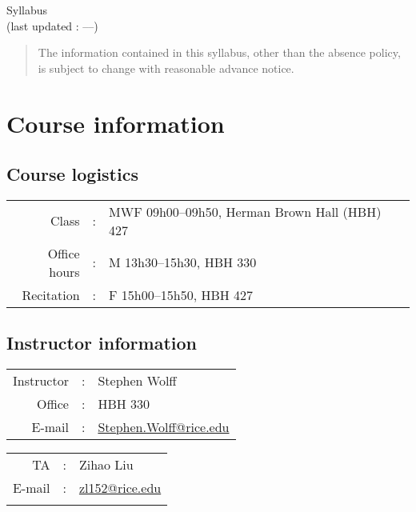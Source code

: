 \begin{center}
{\Large Syllabus}\\
{\scriptsize (last updated : \Year--\Month--\Day)}
\end{center}



\begin{quote}
The information contained in this syllabus, other than the absence policy, is subject to change with reasonable advance notice.
\end{quote}





%
%
%
%

\section{Course information}



\subsection{Course logistics}

\begin{tabular}{r c l}
Class			&	:	&	MWF 09h00--09h50, Herman Brown Hall (HBH) 427	\\
Office hours	&	:	&	M 13h30--15h30, HBH 330	\\
Recitation		&	:	&	F 15h00--15h50, HBH 427
\end{tabular}



\subsection{Instructor information}

\begin{tabular}{r c l}
Instructor	&	:	&	Stephen Wolff	\\
Office	&	:	&	HBH 330	\\
E-mail	&	:	&	\href{mailto:Stephen.Wolff@rice.edu?subject=[Math\%20357]}{Stephen.Wolff@rice.edu}
\end{tabular}
\hspace{0.25in}
\begin{tabular}{r c l}
TA		&	:	&	Zihao Liu	\\
E-mail	&	:	&	\href{mailto:zl152@rice.edu?subject=[Math\%20357]}{zl152@rice.edu}	\\
			&		&%
\end{tabular}



